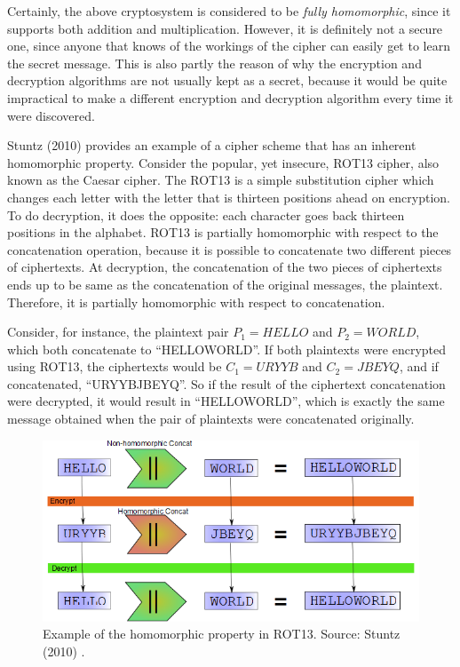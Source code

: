 Certainly, the above cryptosystem is considered to be \emph{fully homomorphic}, since it supports both addition and multiplication. However, it is definitely not a secure one, since anyone that knows of the workings of the cipher can easily get to learn the secret message. This is also partly the reason of why the encryption and decryption algorithms are not usually kept as a secret, because it would be quite impractical to make a different encryption and decryption algorithm every time it were discovered. 

Stuntz (2010) \cite{stuntz2010} provides an example of a cipher scheme that has an inherent homomorphic property. Consider the popular, yet insecure, ROT13 cipher, also known as the Caesar cipher. The ROT13 is a simple substitution cipher which changes each letter with the letter that is thirteen positions ahead on encryption. To do decryption, it does the opposite: each character goes back thirteen positions in the alphabet. 
ROT13 is partially homomorphic with respect to the concatenation operation, because it is possible to concatenate two different pieces of ciphertexts. At decryption, the concatenation of the two pieces of ciphertexts ends up to be same as the concatenation of the original messages, the plaintext. Therefore, it is partially homomorphic with respect to concatenation. 

Consider, for instance, the plaintext pair $P_{1}=HELLO$ and $P_{2}=WORLD$, which both concatenate to ``HELLOWORLD''. If both plaintexts were encrypted using ROT13, the ciphertexts would be $C_{1}=URYYB$ and $C_{2}=JBEYQ$, and if concatenated, ``URYYBJBEYQ''. So if the result of the ciphertext concatenation were decrypted, it would result in ``HELLOWORLD'', which is exactly the same message obtained when the pair of plaintexts were concatenated originally.

\begin{figure}[H]
  \centerline{\includegraphics[scale=0.5]{img/rot13homo}}
  \caption{Example of the homomorphic property in ROT13. Source: Stuntz (2010) \cite{stuntz2010}.}
\end{figure}

